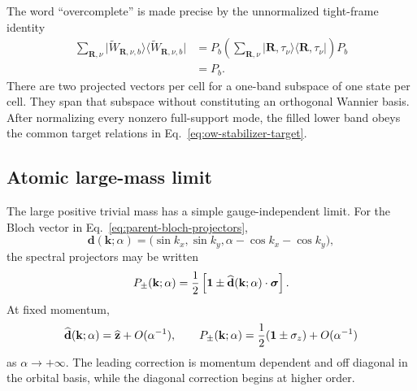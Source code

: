The word ``overcomplete'' is made precise by the unnormalized tight-frame
identity
\begin{align}
    \sum_{\mathbf R,\nu}
      \lvert\widetilde W_{\mathbf R,\nu,b}\rangle
      \langle\widetilde W_{\mathbf R,\nu,b}\rvert
    &=P_b\left(\sum_{\mathbf R,\nu}
      \lvert\mathbf R,\tau_\nu\rangle
      \langle\mathbf R,\tau_\nu\rvert\right)P_b
      \nonumber\\
    &=P_b.
    \label{eq:app-tight-frame-proof}
\end{align}
There are two projected vectors per cell for a one-band subspace of one state
per cell.  They span that subspace without constituting an orthogonal Wannier
basis.  After normalizing every nonzero full-support mode, the filled lower
band obeys the common target relations in
Eq.~\eqref{eq:ow-stabilizer-target}.

\subsection{Atomic large-mass limit}
\label{app:atomic-large-mass-limit}

The large positive trivial mass has a simple gauge-independent limit.  For
the Bloch vector in Eq.~\eqref{eq:parent-bloch-projectors},
\begin{equation}
    \mathbf d(\mathbf k;\alpha)
    =\bigl(\sin k_x,\sin k_y,
      \alpha-\cos k_x-\cos k_y\bigr),
\end{equation}
the spectral projectors may be written
\begin{equation}
    P_\pm(\mathbf k;\alpha)
    =\frac12\left[\mathbf{1}\pm
      \widehat{\mathbf d}(\mathbf k;\alpha)\cdot\boldsymbol\sigma\right].
    \label{eq:app-projector-unit-vector}
\end{equation}
At fixed momentum,
\begin{equation}
    \widehat{\mathbf d}(\mathbf k;\alpha)
    =\widehat{\mathbf z}+O(\alpha^{-1}),
    \qquad
    P_\pm(\mathbf k;\alpha)
    =\frac12(\mathbf{1}\pm\sigma_z)+O(\alpha^{-1})
    \label{eq:app-large-mass-projectors}
\end{equation}
as \(\alpha\to+\infty\).  The leading correction is momentum dependent and
off diagonal in the orbital basis, while the diagonal correction begins at
higher order.

